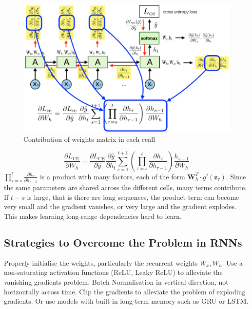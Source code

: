 \documentclass[11pt]{article}
\begin{document}
\begin{figure}[H]
	\centering
	\includegraphics[width=0.8\linewidth]{img/simple_rnn_weights_gradient}
	\caption{Contribution of weights matrix in each ceall}
	\label{fig:simplernnweightsgradient}
\end{figure}

\begin{equation*}
	\frac{\partial L_{\text{CE}}}{\partial W_h} = \frac{\partial L_{\text{CE}}}{\partial \hat{y}}\frac{\partial \hat{y}}{\partial h_t}\sum_{s=1}^{t+1}\left(\prod_{\tau=s}^{t}\frac{\partial h_\tau}{\partial h_{\tau-1}}\right)\frac{h_{s-1}}{\partial W_h}
\end{equation*}
\noindent
$\prod_{\tau=s}^{t}\frac{\partial h_\tau}{\partial h_{\tau-1}}$ is a product with many factors, each of the form $\textbf{W}_h^T\cdot g'(\textbf{z}_\tau)$. Since the same parameters are shared across the different cells, many terms contribute. If $t-s$ is large, that is there are long sequences, the product term can become very small and the gradient vanishes, or very large and the gradient explodes. This makes learning long-range dependencies hard to learn.

\subsection{Strategies to Overcome the Problem in RNNs}
Properly initialise the weights, particularly the recurrent weights $W_x, W_h$. Use a non-saturating activation functions (ReLU, Leaky ReLU) to alleviate the vanishing gradients problem. Batch Normalisation in vertical direction, not horizontally across time. Clip the gradients to alleviate the problem of exploding gradients. Or use models with built-in long-term memory such as GRU or LSTM.
\end{document}
